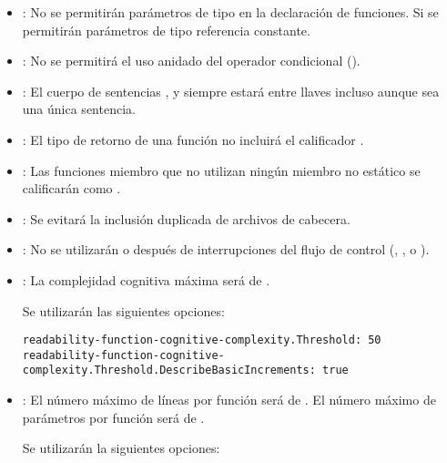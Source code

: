 \begin{itemize}

\item {}:
No se permitirán parámetros de tipo  en la declaración de
funciones.
Si se permitirán parámetros de tipo referencia constante.

\item {}:
No se permitirá el uso anidado del operador condicional ().

\item {}:
El cuerpo de sentencias ,  y 
siempre estará entre llaves incluso aunque sea una única sentencia.

\item {}:
El tipo de retorno de una función no incluirá el calificador .

\item {}:
Las funciones miembro que no utilizan ningún miembro no estático se calificarán
como .

\item {}:
Se evitará la inclusión duplicada de archivos de cabecera.

\item {}:
No se utilizarán  o  después de interrupciones del
flujo de control (, ,  o
).

\item {}:
La complejidad cognitiva máxima será de .

Se utilizarán las siguientes opciones:

\begin{lstlisting}
readability-function-cognitive-complexity.Threshold: 50
readability-function-cognitive-complexity.Threshold.DescribeBasicIncrements: true
\end{lstlisting}

\item {}:
El número máximo de líneas por función será de .
El número máximo de parámetros por función será de .

Se utilizarán la siguientes opciones:


\end{itemize}
